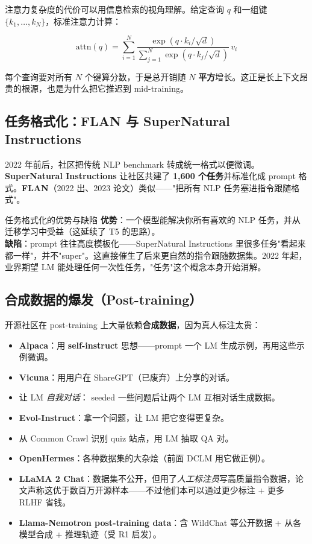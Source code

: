 \documentclass[a4paper]{article}
\begin{document}
注意力复杂度的代价可以用信息检索的视角理解。给定查询 $q$ 和一组键 $\{k_1, \dots, k_N\}$，标准注意力计算：

\[
\mathrm{ attn }(q) = \sum_{i=1}^{N} \frac{\exp(q \cdot k_i / \sqrt{d})}{\sum_{j=1}^{N} \exp(q \cdot k_j / \sqrt{d})}\, v_i
\]

每个查询要对所有 $N$ 个键算分数，于是总开销随 $N$ \textbf{平方}增长。这正是长上下文昂贵的根源，也是为什么把它推迟到 mid-training。

\subsection{任务格式化：FLAN 与 SuperNatural Instructions}

2022 年前后，社区把传统 NLP benchmark 转成统一格式以便微调。\textbf{SuperNatural Instructions} 让社区共建了 \textbf{1,600 个任务}并标准化成 prompt 格式。\textbf{FLAN}（2022 出、2023 论文）类似——"把所有 NLP 任务塞进指令跟随格式"。

\begin{practicebox}{任务格式化的优势与缺陷}
\textbf{优势}：一个模型能解决你所有喜欢的 NLP 任务，并从迁移学习中受益（这延续了 T5 的思路）。\\
\textbf{缺陷}：prompt 往往高度模板化——SuperNatural Instructions 里很多任务"看起来都一样"，并不"super"。这直接催生了后来更自然的指令跟随数据集。2022 年起，业界期望 LM 能处理任何一次性任务，"任务"这个概念本身开始消解。
\end{practicebox}

\subsection{合成数据的爆发（Post-training）}

开源社区在 post-training 上大量依赖\textbf{合成数据}，因为真人标注太贵：

\begin{itemize}
\item \textbf{Alpaca}：用 \textbf{self-instruct} 思想——prompt 一个 LM 生成示例，再用这些示例微调。
\item \textbf{Vicuna}：用用户在 ShareGPT（已废弃）上分享的对话。
\item 让 LM \emph{自我对话}： seeded 一些问题后让两个 LM 互相对话生成数据。
\item \textbf{Evol-Instruct}：拿一个问题，让 LM 把它变得更复杂。
\item 从 Common Crawl 识别 quiz 站点，用 LM 抽取 QA 对。
\item \textbf{OpenHermes}：各种数据集的大杂烩（前面 DCLM 用它做正例）。
\item \textbf{LLaMA 2 Chat}：数据集不公开，但用了\emph{人工标注员}写高质量指令数据，论文声称这优于数百万开源样本——不过他们本可以通过更少标注 + 更多 RLHF 省钱。
\item \textbf{Llama-Nemotron post-training data}：含 WildChat 等公开数据 + 从各模型合成 + 推理轨迹（受 R1 启发）。
\end{itemize}
\end{document}
